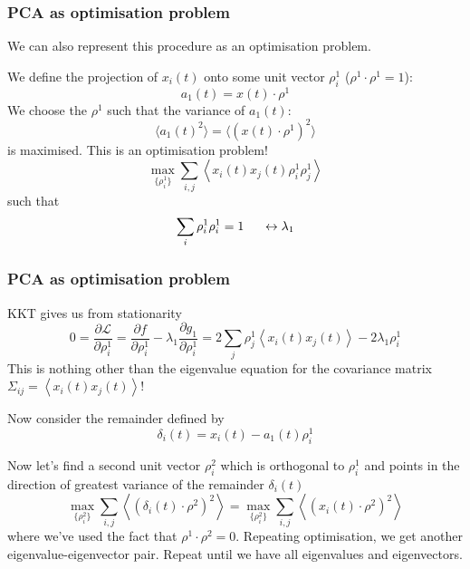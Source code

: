 \documentclass[10pt,aspectratio=169,dvipsnames]{beamer}
\def\d{\partial}
\begin{document}
\begin{frame}
  \frametitle{PCA as optimisation problem}
  We can also represent this procedure as an optimisation problem.

  We define the projection of $x_i(t)$ onto some unit vector $\rho^1_i$ ($\rho^1 \cdot \rho^1 =1$):
  \begin{equation*}
    a_1(t) = x(t) \cdot \rho^1
  \end{equation*}
  We choose the $\rho^1$ such that the variance of $a_1(t)$:
  \begin{equation*}
    \langle a_1(t)^2 \rangle = \langle (x(t) \cdot \rho^1)^2 \rangle
  \end{equation*}
  is maximised. This is an optimisation problem!
  \begin{equation*}
    \max_{\{\rho_i^1\}} \sum_{i,j} \left\langle x_i(t)x_j(t) \rho^1_i  \rho^1_j \right\rangle
  \end{equation*}
  such that
  \begin{equation*}
    \sum_i \rho^1_i \rho^1_i = 1 \hspace{.5cm} \leftrightarrow \lambda_1
  \end{equation*}

\end{frame}


\begin{frame}
  \frametitle{PCA as optimisation problem}

  KKT gives us from stationarity
  \begin{equation*}
    0 = \frac{\d \mathcal{L}}{\d \rho^1_i} = \frac{\d f}{\d \rho^1_i} - \lambda_1 \frac{\d g_1}{\d \rho^1_i} = 2\sum_j \rho^1_j \left\langle x_i(t)x_j(t) \right\rangle - 2\lambda_1 \rho^1_i
  \end{equation*}
  This is nothing other than the eigenvalue equation for the covariance matrix $\Sigma_{ij} = \left\langle x_i(t)x_j(t) \right\rangle$!

  Now consider the remainder defined by
  \begin{equation*}
    \delta_i(t) = x_i(t) - a_1(t) \rho^1_i
  \end{equation*}

  Now let's find a second unit vector $\rho^2_i$ which is orthogonal to $\rho^1_i$ and points in the direction of greatest variance of the remainder $\delta_i(t)$
  \begin{equation*}
    \max_{\{\rho_i^2\}} \sum_{i,j} \left\langle (\delta_i (t) \cdot \rho^2)^2 \right\rangle =     \max_{\{\rho_i^2\}} \sum_{i,j} \left\langle (x_i (t) \cdot \rho^2)^2 \right\rangle
  \end{equation*}
  where we've used the fact that $\rho^1 \cdot \rho^2 = 0$. Repeating optimisation, we get another eigenvalue-eigenvector pair. Repeat until we have all eigenvalues and eigenvectors.

\end{frame}
\end{document}
